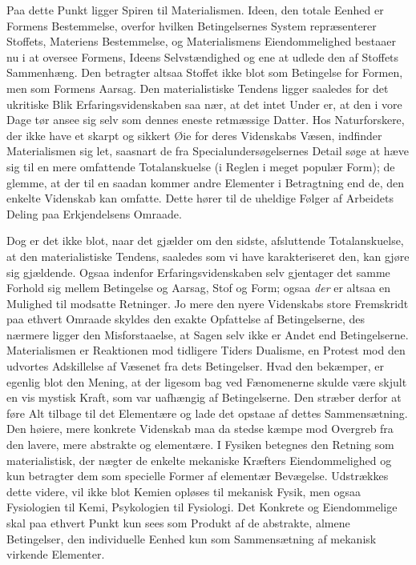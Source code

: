 \documentclass[12pt,a4paper,openany]{book}
\newcommand{\opage}[1]{\marginnote{\footnotesize\textit{[#1]}}}
\begin{document}
Paa dette Punkt ligger Spiren til Materialismen.
Ideen, den totale Eenhed er Formens Bestemmelse, overfor
hvilken Betingelsernes System repræsenterer Stoffets, Materiens
Bestemmelse, og Materialismens Eiendommelighed
bestaaer nu i at oversee Formens, Ideens Selvstændighed og
ene at udlede den af Stoffets Sammenhæng. Den betragter
altsaa Stoffet ikke blot som Betingelse for Formen, men
som Formens Aarsag. Den materialistiske Tendens ligger
saaledes for det ukritiske Blik Erfaringsvidenskaben saa nær,
at det intet Under er, at den i vore Dage tør ansee sig selv
som dennes eneste retmæssige Datter. Hos Naturforskere, der
ikke have et skarpt og sikkert Øie for deres Videnskabs
Væsen, indfinder Materialismen sig let, saasnart de fra
Specialundersøgelsernes Detail søge at hæve sig til en mere
omfattende Totalanskuelse (i Reglen i meget populær Form);
de glemme, at der til en saadan kommer andre Elementer
i Betragtning end de, den enkelte Videnskab kan omfatte.
\opage{196}Dette hører til de uheldige Følger af Arbeidets Deling paa
Erkjendelsens Omraade.

Dog er det ikke blot, naar det gjælder om den sidste,
afsluttende Totalanskuelse, at den materialistiske Tendens,
saaledes som vi have karakteriseret den, kan gjøre sig gjældende.
Ogsaa indenfor Erfaringsvidenskaben selv gjentager
det samme Forhold sig mellem Betingelse og Aarsag, Stof
og Form; ogsaa \emph{der} er altsaa en Mulighed til modsatte
Retninger. Jo mere den nyere Videnskabs store Fremskridt
paa ethvert Omraade skyldes den exakte Opfattelse af Betingelserne,
des nærmere ligger den Misforstaaelse, at Sagen
selv ikke er Andet end Betingelserne. Materialismen er
Reaktionen mod tidligere Tiders Dualisme, en Protest mod
den udvortes Adskillelse af Væsenet fra dets Betingelser.
Hvad den bekæmper, er egenlig blot den Mening, at der
ligesom bag ved Fænomenerne skulde være skjult en vis
mystisk Kraft, som var uafhængig af Betingelserne. Den
stræber derfor at føre Alt tilbage til det Elementære og lade
det opstaae af dettes Sammensætning. Den høiere, mere
konkrete Videnskab maa da stedse kæmpe mod Overgreb
fra den lavere, mere abstrakte og elementære. I Fysiken
betegnes den Retning som materialistisk, der nægter de enkelte
mekaniske Kræfters Eiendommelighed og kun betragter dem
som specielle Former af elementær Bevægelse. Udstrækkes
dette videre, vil ikke blot Kemien opløses til mekanisk Fysik,
men ogsaa Fysiologien til Kemi, Psykologien til Fysiologi.
Det Konkrete og Eiendommelige skal paa ethvert Punkt kun
sees som Produkt af de abstrakte, almene Betingelser, den
individuelle Eenhed kun som Sammensætning af mekanisk
virkende Elementer.
\end{document}
